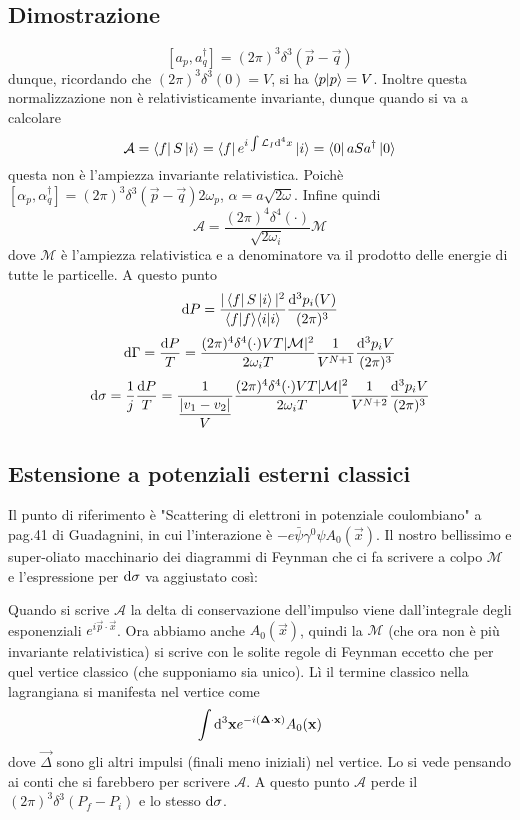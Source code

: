 \documentclass[12pt,a4paper]{article}
\begin{document}
	\subsection{Dimostrazione}
	\[ [a_p,a_q^\dagger] = (2\pi)^3 \delta^3(\vec{p}-\vec{q}) \]
	dunque, ricordando che $(2\pi)^3 \delta^3(0) = V$, si ha $\langle p\vert p\rangle = V$. Inoltre questa normalizzazione non è relativisticamente invariante, dunque quando si va a calcolare
	\[ \mathcal{A} = \left\langle f\right|S\left| i\right\rangle = \left\langle f\right|e^{i\int \mathcal{L}_I \mathrm{d}^4 x} \left| i\right\rangle = \left\langle 0\right|aSa^\dagger\left| 0\right\rangle \]
	questa non è l'ampiezza invariante relativistica. Poichè $[\alpha_p,\alpha_q^\dagger] = (2\pi)^3 \delta^3(\vec{p}-\vec{q}) 2\omega_p$, $\alpha = a \sqrt{2\omega}$. Infine quindi
	\[ \mathcal{A} = \dfrac{(2\pi)^4 \delta^4(\cdot)}{\sqrt{2\omega_i}} \mathcal{M} \]
	dove $\mathcal{M}$ è l'ampiezza relativistica e a denominatore va il prodotto delle energie di tutte le particelle. A questo punto
	\[ \mathrm{d} P = \dfrac{|\left\langle f\right|S\left| i\right\rangle|^2}{\langle f\vert f\rangle \langle i\vert i\rangle } \dfrac{\mathrm{d}^3 p_i(V)}{(2\pi)^3} \]
	\[ \mathrm{d} \Gamma = \dfrac{\mathrm{d} P}{T} = \dfrac{(2\pi)^4 \delta^4(\cdot) VT |\mathcal{M}|^2 }{2\omega_i T} \dfrac{1}{V^{N+1}} \dfrac{\mathrm{d}^3 p_i V}{(2\pi)^3} \]
	\[ \mathrm{d}\sigma = \dfrac{1}{j} \dfrac{\mathrm{d} P}{T} = \dfrac{1}{\dfrac{|v_1-v_2|}{V}} \dfrac{(2\pi)^4 \delta^4(\cdot) VT |\mathcal{M}|^2 }{2\omega_i T} \dfrac{1}{V^{N+2}} \dfrac{\mathrm{d}^3 p_i V}{(2\pi)^3} \]
	
	\subsection{Estensione a potenziali esterni classici}
	Il punto di riferimento è "Scattering di elettroni in potenziale coulombiano" a pag.41 di Guadagnini, in cui l'interazione è $-e\bar{\psi}\gamma^0\psi A_0(\vec{x})$. Il nostro bellissimo e super-oliato macchinario dei diagrammi di Feynman che ci fa scrivere a colpo $\mathcal{M}$ e l'espressione per $\mathrm{d} \sigma$ va aggiustato così:
	
	Quando si scrive $\mathcal{A}$ la delta di conservazione dell'impulso viene dall'integrale degli esponenziali $e^{i\vec{p}\cdot\vec{x}}$. Ora abbiamo anche $A_0(\vec{x})$, quindi la $\mathcal{M}$ (che ora non è più invariante relativistica) si scrive con le solite regole di Feynman eccetto che per quel vertice classico (che supponiamo sia unico). Lì il termine classico nella lagrangiana si manifesta nel vertice come
	\[ \int \mathrm{d}^3\mathbf{x} e^{-i(\mathbf{\Delta}\cdot\mathbf{x})} A_0(\mathbf{x}) \]
	dove $\vec{\Delta}$ sono gli altri impulsi (finali meno iniziali) nel vertice. Lo si vede pensando ai conti che si farebbero per scrivere $\mathcal{A}$. A questo punto $\mathcal{A}$ perde il $(2\pi)^3 \delta^3(P_f-P_i)$ e lo stesso $\mathrm{d} \sigma$.
	
\end{document}

